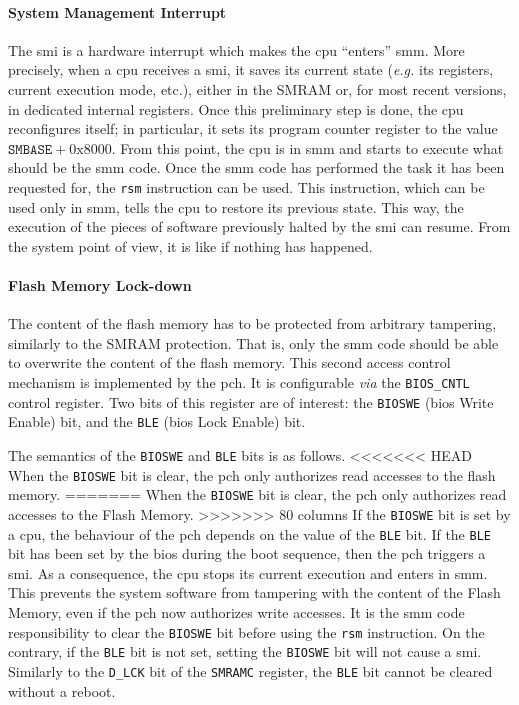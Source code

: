 \paragraph{System Management Interrupt}

The \ac{smi} is a hardware interrupt which makes the \ac{cpu} ``enters''
\ac{smm}. 
%
More precisely, when a \ac{cpu} receives a \ac{smi}, it saves its current state
(\emph{e.g.} its registers, current execution mode, etc.), either in the SMRAM
or, for most recent versions, in dedicated internal registers. 
%
Once this preliminary step is done, the \ac{cpu} reconfigures itself;
%
in particular, it sets its program counter register to  the value
$\mathtt{SMBASE} + \mathrm{0x8000}$.
%
From this point, the \ac{cpu} is in \ac{smm} and starts to execute what should
be the \ac{smm} code.
%
Once the \ac{smm} code has performed the task it has been requested for, the
\texttt{rsm} instruction can be used.
%
This instruction, which can be used only in \ac{smm}, tells the \ac{cpu} to
restore its previous state.
%
This way, the execution of the pieces of software previously halted by the
\ac{smi} can resume.
%
From the system point of view, it is like if nothing has happened. 

\paragraph{Flash Memory Lock-down}
%
The content of the flash memory has to be protected from arbitrary tampering,
similarly to the SMRAM protection.
%
That is, only the \ac{smm} code should be able to overwrite the content of
the flash memory.
%
This second access control mechanism is implemented by the \ac{pch}.
%
It is configurable \emph{via} the \texttt{BIOS\_CNTL} control
register.
%
Two bits of this register are of interest: the \texttt{BIOSWE} (\ac{bios} Write
Enable) bit, and the \texttt{BLE} (\ac{bios} Lock Enable) bit.

The semantics of the \texttt{BIOSWE} and \texttt{BLE} bits is as follows.
%
<<<<<<< HEAD
When the \texttt{BIOSWE} bit is clear, the \ac{pch} only authorizes read accesses to
the flash memory.
=======
When the \texttt{BIOSWE} bit is clear, the \ac{pch} only authorizes read
accesses to the Flash Memory.
>>>>>>> 80 columns
%
If the \texttt{BIOSWE} bit is set by a \ac{cpu}, the behaviour of the \ac{pch}
depends on the value of the \texttt{BLE} bit.
%
If the \texttt{BLE} bit has been set by the \ac{bios} during the boot sequence,
then the \ac{pch} triggers a \ac{smi}.
%
As a consequence, the \ac{cpu} stops its current execution and enters in
\ac{smm}.
%
This prevents the system software from tampering with the content of the Flash
Memory, even if the \ac{pch} now authorizes write accesses.
%
It is the \ac{smm} code responsibility to clear the \texttt{BIOSWE} bit before
using the \texttt{rsm} instruction.
%
On the contrary, if the \texttt{BLE} bit is not set, setting the \texttt{BIOSWE}
bit will not cause a \ac{smi}.
%
Similarly to the \texttt{D\_LCK} bit of the \texttt{SMRAMC} register, the
\texttt{BLE} bit cannot be cleared without a reboot.

